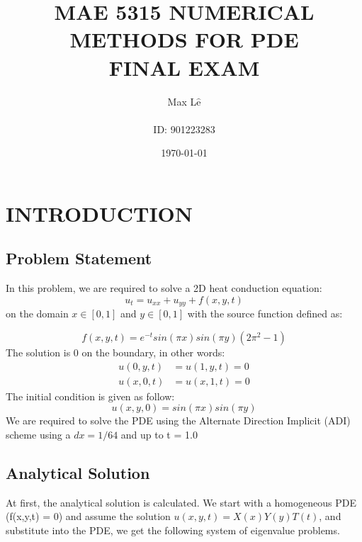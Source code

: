 \documentclass[12pt]{article}
\title{MAE 5315 NUMERICAL METHODS FOR PDE \\ FINAL EXAM}
\date{\today}
\author{\Huge Max L$\hat{\textrm{e}}$ \\ \\ ID: 901223283}
\begin{document}
	\maketitle
	\newpage
	\tableofcontents
	\newpage
	\listoffigures
	\newpage
	\section{INTRODUCTION}
	\subsection{Problem Statement}
	In this problem, we are required to solve a 2D heat conduction equation:		
	\begin{equation}
		u_t = u_{xx} + u_{yy} + f(x,y,t)
	\end{equation}
	on the domain $x\in [0,1]$ and $y\in [0,1]$ with the source function defined as: 
	
	\begin{equation}
	f(x,y,t) = e^{-t}sin(\pi x)sin(\pi y)(2\pi ^2 -1)
	\end{equation}	
	The solution is 0 on the boundary, in other words: 
	\begin{align*}
		u(0,y,t) &= u(1,y,t) = 0 \\ 
		u(x,0,t) &= u(x,1,t) = 0
	\end{align*}  	
	The initial condition is given as follow: 
	\begin{equation}
	u(x,y,0) = sin(\pi x)sin(\pi y)
	\end{equation}
	We are required to solve the PDE using the Alternate Direction Implicit (ADI) scheme using a $dx = 1/64$ and up to t = 1.0  

	\subsection{Analytical Solution}
	At first, the analytical solution is calculated. We start with a homogeneous PDE (f(x,y,t) = 0) and assume the solution $u(x,y,t) = X(x)Y(y)T(t)$, and substitute into the PDE, we get the following system of eigenvalue problems. 
	
\end{document}
